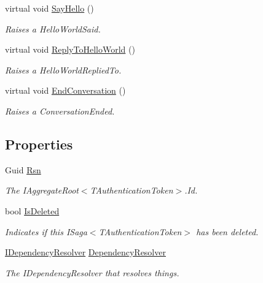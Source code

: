 \begin{DoxyCompactItemize}
virtual void \hyperlink{classCqrs_1_1Akka_1_1Tests_1_1Unit_1_1Aggregates_1_1HelloWorld_a2c5e579e741dc3471e3532f5be3b98ab_a2c5e579e741dc3471e3532f5be3b98ab}{Say\+Hello} ()
\begin{DoxyCompactList}\small\item\em Raises a Hello\+World\+Said. \end{DoxyCompactList}\item 
virtual void \hyperlink{classCqrs_1_1Akka_1_1Tests_1_1Unit_1_1Aggregates_1_1HelloWorld_a6b3c07d040e703d89c7a065064776623_a6b3c07d040e703d89c7a065064776623}{Reply\+To\+Hello\+World} ()
\begin{DoxyCompactList}\small\item\em Raises a Hello\+World\+Replied\+To. \end{DoxyCompactList}\item 
virtual void \hyperlink{classCqrs_1_1Akka_1_1Tests_1_1Unit_1_1Aggregates_1_1HelloWorld_aeeb20725d192b64adf47281d37dd198d_aeeb20725d192b64adf47281d37dd198d}{End\+Conversation} ()
\begin{DoxyCompactList}\small\item\em Raises a Conversation\+Ended. \end{DoxyCompactList}\end{DoxyCompactItemize}
\subsection*{Properties}
\begin{DoxyCompactItemize}
\item 
Guid \hyperlink{classCqrs_1_1Akka_1_1Tests_1_1Unit_1_1Aggregates_1_1HelloWorld_a2e74fa47e00d67d6de3df5b1b8e140f6_a2e74fa47e00d67d6de3df5b1b8e140f6}{Rsn}
\begin{DoxyCompactList}\small\item\em The I\+Aggregate\+Root$<$\+T\+Authentication\+Token$>$.\+Id. \end{DoxyCompactList}\item 
bool \hyperlink{classCqrs_1_1Akka_1_1Tests_1_1Unit_1_1Aggregates_1_1HelloWorld_acb0b1bde01be12368433ebbb8f20eba9_acb0b1bde01be12368433ebbb8f20eba9}{Is\+Deleted}
\begin{DoxyCompactList}\small\item\em Indicates if this I\+Saga$<$\+T\+Authentication\+Token$>$ has been deleted. \end{DoxyCompactList}\item 
\hyperlink{interfaceCqrs_1_1Configuration_1_1IDependencyResolver}{I\+Dependency\+Resolver} \hyperlink{classCqrs_1_1Akka_1_1Tests_1_1Unit_1_1Aggregates_1_1HelloWorld_abf66c1d14c78b9ed3ca54225d04a8beb_abf66c1d14c78b9ed3ca54225d04a8beb}{Dependency\+Resolver}
\begin{DoxyCompactList}\small\item\em The I\+Dependency\+Resolver that resolves things. \end{DoxyCompactList}\end{DoxyCompactItemize}
